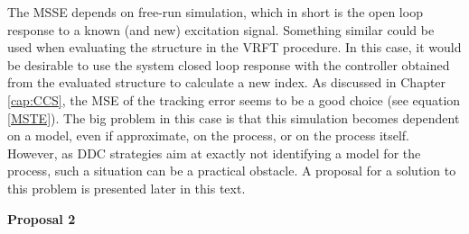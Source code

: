 The MSSE depends on free-run simulation, which in short is the open loop response to a known (and new) excitation signal. Something similar could be used when evaluating the structure in the VRFT procedure. In this case, it would be desirable to use the system closed loop response with the controller obtained from the evaluated structure to calculate a new index. As discussed in Chapter \ref{cap:CCS}, the MSE of the tracking error seems to be a good choice (see equation \ref{MSTE}). The big problem in this case is that this simulation becomes dependent on a model, even if approximate, on the process, or on the process itself. However, as DDC strategies aim at exactly not identifying a model for the process, such a situation can be a practical obstacle. A proposal for a solution to this problem is presented later in this text.

\medskip
\textbf{Proposal 2} 

